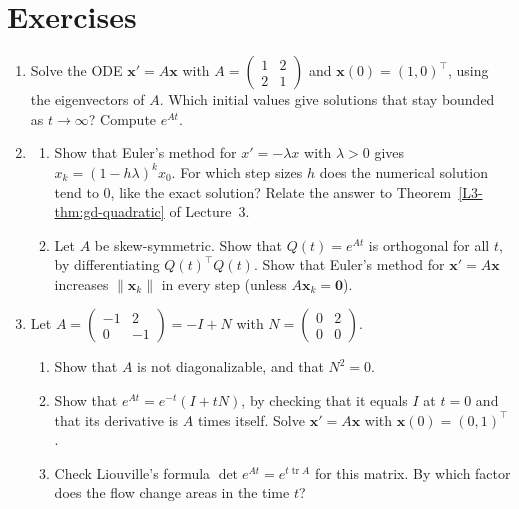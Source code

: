 \documentclass[11pt]{article}
\newcommand{\norm}[1]{\lVert #1 \rVert}
\theoremstyle{definition}
\theoremstyle{plain}
\theoremstyle{remark}
\DeclareMathOperator{\tr}{tr}
\begin{document}
\section{Exercises}\label{sec:exercises}
\begin{enumerate}[leftmargin=*]
    \item Solve the ODE $\mathbf{x}' = A\mathbf{x}$ with $A = \begin{pmatrix} 1 & 2 \\ 2 & 1 \end{pmatrix}$ and $\mathbf{x}(0) = (1, 0)^\top$, using the eigenvectors of $A$. Which initial values give solutions that stay bounded as $t \to \infty$? Compute $e^{At}$.
    \item\label{ex5:euler-skew} \begin{enumerate}[label=(\alph*)]
        \item Show that Euler's method for $x' = -\lambda x$ with $\lambda > 0$ gives $x_k = (1 - h\lambda)^k x_0$. For which step sizes $h$ does the numerical solution tend to $0$, like the exact solution? Relate the answer to Theorem~\ref{L3-thm:gd-quadratic} of Lecture~3.
        \item Let $A$ be skew-symmetric. Show that $Q(t) = e^{At}$ is orthogonal for all $t$, by differentiating $Q(t)^\top Q(t)$. Show that Euler's method for $\mathbf{x}' = A\mathbf{x}$ increases $\norm{\mathbf{x}_k}$ in every step (unless $A\mathbf{x}_k = \mathbf{0}$).
    \end{enumerate}
    \item\label{ex5:nilpotent} Let $A = \begin{pmatrix} -1 & 2 \\ 0 & -1 \end{pmatrix} = -I + N$ with $N = \begin{pmatrix} 0 & 2 \\ 0 & 0 \end{pmatrix}$.
    \begin{enumerate}[label=(\alph*)]
        \item Show that $A$ is not diagonalizable, and that $N^2 = 0$.
        \item Show that $e^{At} = e^{-t}(I + tN)$, by checking that it equals $I$ at $t = 0$ and that its derivative is $A$ times itself. Solve $\mathbf{x}' = A\mathbf{x}$ with $\mathbf{x}(0) = (0, 1)^\top$.
        \item Check Liouville's formula $\det e^{At} = e^{t\tr A}$ for this matrix. By which factor does the flow change areas in the time $t$?
    \end{enumerate}

\end{enumerate}
\end{document}
